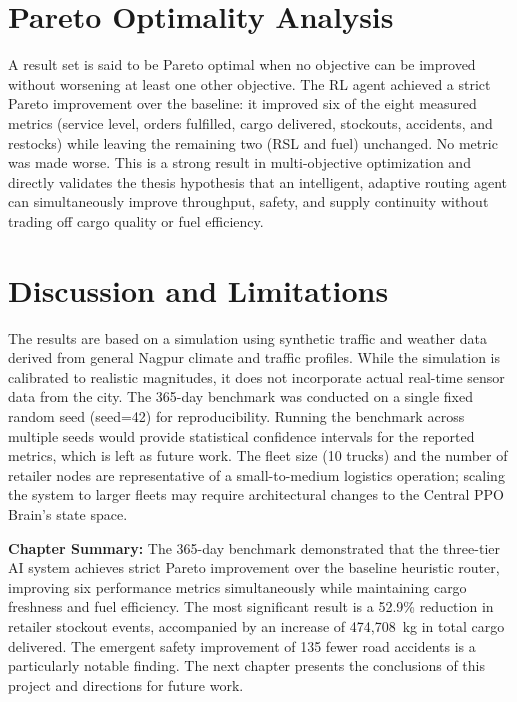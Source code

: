 \section{Pareto Optimality Analysis}

A result set is said to be Pareto optimal when no objective can be improved without
worsening at least one other objective. The RL agent achieved a strict Pareto
improvement over the baseline: it improved six of the eight measured metrics
(service level, orders fulfilled, cargo delivered, stockouts, accidents, and
restocks) while leaving the remaining two (RSL and fuel) unchanged. No metric was
made worse. This is a strong result in multi-objective optimization and directly
validates the thesis hypothesis that an intelligent, adaptive routing agent can
simultaneously improve throughput, safety, and supply continuity without trading
off cargo quality or fuel efficiency.

\section{Discussion and Limitations}

The results are based on a simulation using synthetic traffic and weather data
derived from general Nagpur climate and traffic profiles. While the simulation is
calibrated to realistic magnitudes, it does not incorporate actual real-time sensor
data from the city. The 365-day benchmark was conducted on a single fixed random
seed (seed=42) for reproducibility. Running the benchmark across multiple seeds
would provide statistical confidence intervals for the reported metrics, which is
left as future work. The fleet size (10 trucks) and the number of retailer nodes
are representative of a small-to-medium logistics operation; scaling the system to
larger fleets may require architectural changes to the Central PPO Brain's state
space.

\vspace{1cm}
\noindent \textbf{Chapter Summary:} The 365-day benchmark demonstrated that the
three-tier AI system achieves strict Pareto improvement over the baseline heuristic
router, improving six performance metrics simultaneously while maintaining cargo
freshness and fuel efficiency. The most significant result is a 52.9\% reduction
in retailer stockout events, accompanied by an increase of 474,708~kg in total
cargo delivered. The emergent safety improvement of 135 fewer road accidents is
a particularly notable finding. The next chapter presents the conclusions of this
project and directions for future work.
